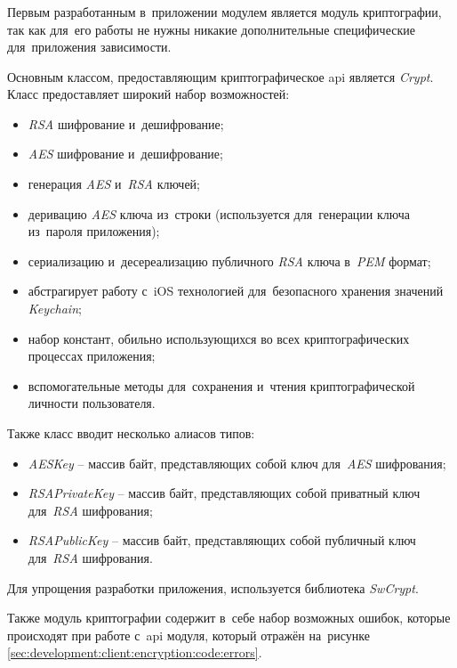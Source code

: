 \subsubsection{}
\label{sec:development:client:encryption}

Первым разработанным в~приложении модулем является модуль криптографии, так как для~его работы не нужны никакие дополнительные специфические для~приложения зависимости.

Основным классом, предоставляющим криптографическое \gls{api} является \textit{Crypt}. Класс предоставляет широкий набор возможностей:

\begin{itemize}
	\item \textit{RSA} шифрование и~дешифрование;
	\item \textit{AES} шифрование и~дешифрование;
	\item генерация \textit{AES} и~\textit{RSA} ключей;
	\item деривацию \textit{AES} ключа из~строки (используется для~генерации ключа из~пароля приложения);
	\item сериализацию и~десереализацию публичного \textit{RSA} ключа в~\textit{PEM} формат;
	\item абстрагирует работу с~iOS технологией для~безопасного хранения значений \textit{Keychain};
	\item набор констант, обильно использующихся во всех криптографических процессах приложения;
	\item вспомогательные методы для~сохранения и~чтения криптографической личности пользователя.
\end{itemize}

Также класс вводит несколько алиасов типов:
\begin{itemize}
	\item \textit{AESKey} -- массив байт, представляющих собой ключ для~\textit{AES} шифрования;
	\item \textit{RSAPrivateKey} -- массив байт, представляющих собой приватный ключ для~\textit{RSA} шифрования;
	\item \textit{RSAPublicKey} -- массив байт, представляющих собой публичный ключ для~\textit{RSA} шифрования.
\end{itemize}

Для упрощения разработки приложения, используется библиотека \textit{SwCrypt}.

Также модуль криптографии содержит в~себе набор возможных ошибок, которые происходят при работе с~\gls{api} модуля, который отражён на~рисунке \ref{sec:development:client:encryption:code:errors}.


